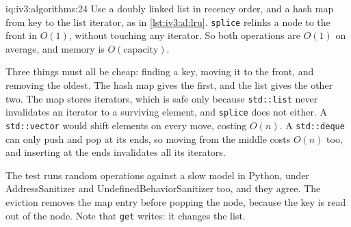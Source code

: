 \begin{solution}{iq:iv3:algorithms:24}
Use a doubly linked list in recency order, and a hash map from key to the list iterator, as in \cref{lst:iv3:al:lru}. \texttt{splice} relinks a node to the front in $O(1)$, without touching any iterator. So both operations are $O(1)$ on average, and memory is $O(\text{capacity})$.
\label{lst:iv3:al:lru}

Three things must all be cheap: finding a key, moving it to the front, and removing the oldest. The hash map gives the first, and the list gives the other two. The map stores iterators, which is safe only because \texttt{std::list} never invalidates an iterator to a surviving element, and \texttt{splice} does not either. A \texttt{std::vector} would shift elements on every move, costing $O(n)$. A \texttt{std::deque} can only push and pop at its ends, so moving from the middle costs $O(n)$ too, and inserting at the ends invalidates all its iterators.

The test runs random operations against a slow model in Python, under AddressSanitizer and UndefinedBehaviorSanitizer too, and they agree. The eviction removes the map entry before popping the node, because the key is read out of the node. Note that \texttt{get} writes: it changes the list.

\end{solution}

